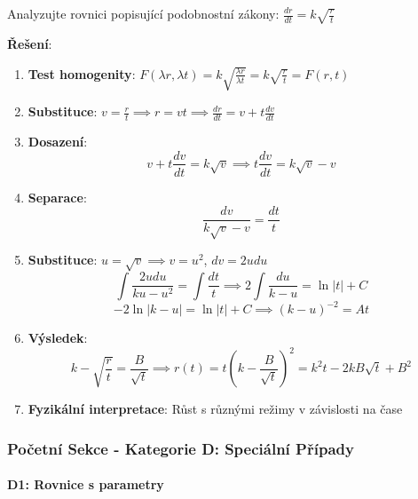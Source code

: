 \begin{example}
Analyzujte rovnici popisující podobnostní zákony: $\frac{dr}{dt} = k\sqrt{\frac{r}{t}}$
\vspace{0.3\baselineskip}

\textbf{Řešení}: 
\begin{enumerate}
\item \textbf{Test homogenity}: $F(\lambda r, \lambda t) = k\sqrt{\frac{\lambda r}{\lambda t}} = k\sqrt{\frac{r}{t}} = F(r,t)$

\item \textbf{Substituce}: $v = \frac{r}{t} \implies r = vt \implies \frac{dr}{dt} = v + t\frac{dv}{dt}$

\item \textbf{Dosazení}:
\[
v + t\frac{dv}{dt} = k\sqrt{v} \implies t\frac{dv}{dt} = k\sqrt{v} - v
\]

\item \textbf{Separace}:
\[
\frac{dv}{k\sqrt{v} - v} = \frac{dt}{t}
\]

\item \textbf{Substituce}: $u = \sqrt{v} \implies v = u^2$, $dv = 2u  du$
\[
\int \frac{2u  du}{ku - u^2} = \int \frac{dt}{t} \implies 2\int \frac{du}{k - u} = \ln|t| + C
\]
\[
-2\ln|k - u| = \ln|t| + C \implies (k - u)^{-2} = At
\]

\item \textbf{Výsledek}:
\[
k - \sqrt{\frac{r}{t}} = \frac{B}{\sqrt{t}} \implies r(t) = t\left(k - \frac{B}{\sqrt{t}}\right)^2 = k^2t - 2kB\sqrt{t} + B^2
\]

\item \textbf{Fyzikální interpretace}: Růst s různými režimy v závislosti na čase
\end{enumerate}
\end{example}

\vspace{0.8\baselineskip}

\subsubsection{Početní Sekce - Kategorie D: Speciální Případy}
\label{subsubsec:pocetni-kategorie-d}

\paragraph*{D1: Rovnice s parametry}

